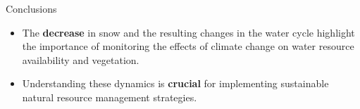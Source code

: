 \documentclass[10pt]{beamer}
\begin{document}
\begin{frame}{Conclusions}
    \begin{itemize}
        \item The \textbf{decrease} in snow and the resulting changes in the water cycle highlight the importance of monitoring the effects of climate change on water resource availability and vegetation.
        \item Understanding these dynamics is \textbf{crucial} for implementing sustainable natural resource management strategies.
    \end{itemize}
\end{frame}
\end{document}
